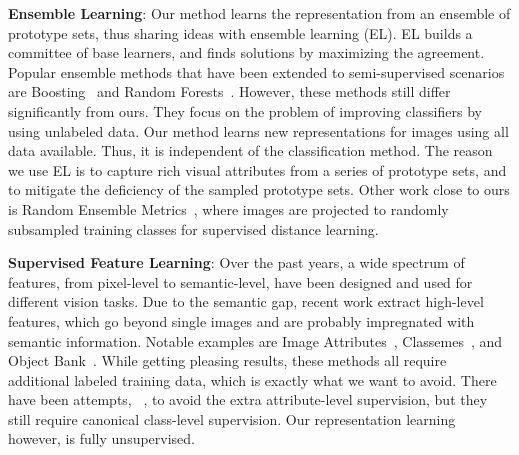 \textbf{Ensemble Learning}: Our method learns the representation from
an ensemble of prototype sets, thus sharing ideas with ensemble
learning (EL). EL builds a committee of base learners, and finds
solutions by maximizing the agreement. Popular ensemble methods that
have been extended to semi-supervised scenarios are
Boosting~\citep{SemiBoost} and Random
Forests~\citep{SemiForest}. However, these methods still differ
significantly from ours. They focus on the problem of improving
classifiers by using unlabeled data. Our method learns new
representations for images using all data available. Thus, it is
independent of the classification method. The reason we use EL is to
capture rich visual attributes from a series of prototype sets, and to
mitigate the deficiency of the sampled prototype sets. Other work
close to ours is 
Random Ensemble Metrics~\citep{ensemble:iccv11}, where images are
projected to randomly subsampled training classes for supervised
distance learning.

\textbf{Supervised Feature Learning}: Over the past years, a wide spectrum of
features, from pixel-level to semantic-level, have been designed and
used for different vision tasks. Due to the semantic gap, recent work
extract high-level features, which go beyond single images and are
probably impregnated with semantic information. Notable examples are
Image Attributes~\citep{ObjectAttribute:cvpr09},
Classemes~\citep{eccv10:classemes}, and Object
Bank~\citep{li:objectbank}. While getting pleasing results, these
methods all require additional labeled training data, which is exactly
what we want to avoid.  There have been
attempts, \eg~\citep{augmented_attribute:eccv12, design_attribute:cvpr13}, to
avoid the extra attribute-level supervision, but they still require
canonical class-level supervision. Our representation learning
however, is fully unsupervised.  

